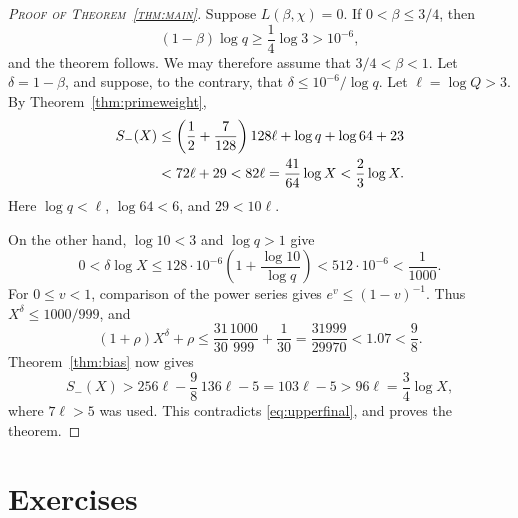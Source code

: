 \documentclass[11pt,twoside,leqno]{article}
\theoremstyle{apostol}
\begin{document}
\begin{proof}[\normalfont\scshape Proof of Theorem~\ref{thm:main}]
Suppose \(L(\beta,\chi)=0\). If \(0<\beta\le3/4\), then
\[
 (1-\beta)\log q\ge\frac14\log3>10^{-6},
\]
and the theorem follows. We may therefore assume that \(3/4<\beta<1\).
Let \(\delta=1-\beta\), and suppose, to the contrary, that
\(\delta\le10^{-6}/\log q\).
Let \(\ell=\log Q>3\). By Theorem~\ref{thm:primeweight},
\begin{align}
 S_-(X)&\le\left(\frac12+\frac7{128}\right)128\ell
                 +\log q+\log64+23\notag\\
       &<72\ell+29<82\ell
        =\frac{41}{64}\log X<\frac23\log X.
        \label{eq:upperfinal}
\end{align}
Here \(\log q<\ell\), \(\log64<6\), and \(29<10\ell\).

On the other hand, \(\log10<3\) and \(\log q>1\) give
\[
 0<\delta\log X
 \le128\cdot10^{-6}\left(1+\frac{\log10}{\log q}\right)
 <512\cdot10^{-6}<\frac1{1000}.
\]
For \(0\le v<1\), comparison of the power series gives
\(e^v\le(1-v)^{-1}\). Thus \(X^\delta\le1000/999\), and
\[
 (1+\rho)X^\delta+\rho
 \le\frac{31}{30}\frac{1000}{999}+\frac1{30}
 =\frac{31999}{29970}<1.07<\frac98.
\]
Theorem~\ref{thm:bias} now gives
\[
 S_-(X)>256\ell-\frac98\,136\ell-5
       =103\ell-5>96\ell=\frac34\log X,
\]
where \(7\ell>5\) was used. This contradicts
\eqref{eq:upperfinal}, and proves the theorem.
\end{proof}

\clearpage
{}
\section*{Exercises}
\end{document}
